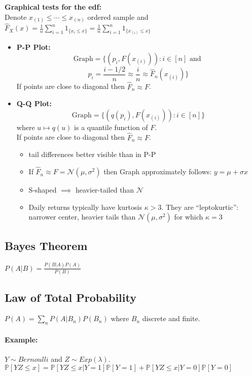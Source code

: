 \textbf{Graphical tests for the edf:} \\
Denote $x_{(1)}\leq\cdots\leq x_{(n)}$ ordered sample and \\
$\hat{F}_X(x) = \frac{1}{n} \sum_{i=1}^n 1_{\{x_i \leq x\}}=\frac{1}{n} \sum_{i=1}^n 1_{\{x_{(i)} \leq x\}}$
\begin{itemize}
    \item \textbf{P-P Plot:} \\
        \[\text{Graph} = \big\{ (p_i, F(x_{(i)})): i\in [n]\text{ and }\]
        \[p_i=\frac{i-1/2}{n}\approx \frac{i}{n}\approx\hat F_n(x_{(i)})\}\]
        If points are close to diagonal then $\hat F_n \approx F$.
    \item \textbf{Q-Q Plot:} \\
        \[\text{Graph}=\{(q(p_i), F(x_{(i)})): i\in [n] \big\} \]
        where $u\mapsto q(u)$ is a quantile function of $F$. \\
        If points are close to diagonal then $\hat F_n \approx F$.
    \begin{itemize}
    \item tail differences better visible than in P-P
    \item
        If $\hat F_n \approx F=\mathcal{N}(\mu, \sigma^2)$ then Graph approximately follows: $y=\mu+\sigma x$
    \item S-shaped $\implies$ heavier-tailed than $\mathcal{N}$
    \item Daily returns typically have kurtosis $\kappa > 3$. They are ``leptokurtic'': narrower center, heavier tails than $\mathcal{N}(\mu,\sigma^2)$ for which $\kappa=3$
    \end{itemize}
\end{itemize}


\subsection*{Bayes Theorem}
$P(A | B) = \frac{P(B | A)P(A)}{P(B)}$
\subsection*{Law of Total Probability}
$P(A) = \sum_n P(A | B_n) P(B_n)$ where $B_n$ discrete and finite.
\paragraph{Example:} $Y \sim Bernoulli$ and $Z \sim Exp(\lambda)$. \\
$\mathbb{P}[YZ \leq x] = \mathbb{P}[YZ \leq x | Y = 1]\mathbb{P}[Y=1]
+ \mathbb{P}[YZ \leq x | Y = 0]\mathbb{P}[Y = 0]$

